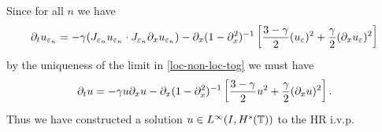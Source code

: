%
Since for all $n$ we have 
%
\begin{equation}
\partial_tu_{\varepsilon_n} 
=
-\gamma (J_{\varepsilon_n} u_{\varepsilon_n}  \cdot
J_{\varepsilon_n}\partial_x u_{\varepsilon_n}) - \partial_x (1-
\partial_x^2)^{-1} \left
[\frac{3-\gamma}{2}(u_\varepsilon)^2 + \frac{\gamma}{2}(\partial_x u_\varepsilon)^2 \right ] 
\end{equation}
%
by the uniqueness  of the limit in \eqref{loc-non-loc-tog}
we must have
%
\begin{equation}
\label{1000y}
\partial_t u =- \gamma u \partial_x u- \partial_x (1- \partial_x^2)^{-1} \left
[\frac{3-\gamma}{2}u^2 + \frac{\gamma}{2}(\partial_x u)^2 \right ].
\end{equation}
%
Thus we have constructed a solution $u \in L^\infty(I, H^s(\mathbb{T}))$
to the HR i.v.p. 
%
%
%
%
%
